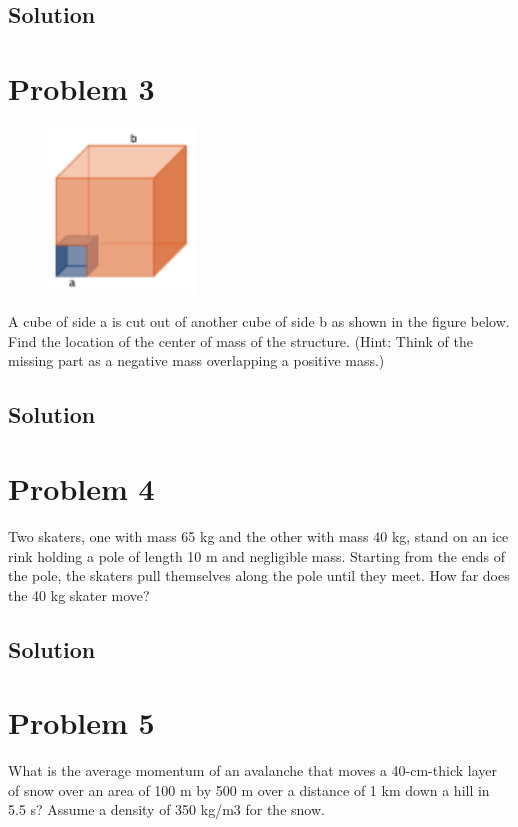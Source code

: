 \documentclass[12pt]{article}
\begin{document}
\subsection*{Solution}


\pagebreak
\section*{Problem 3}
\begin{figure}
    \vspace{-30pt}
    \includegraphics[width=0.35\textwidth]{graph_3.png} 
\end{figure}
A cube of side a is cut out of another cube of side b as shown in the figure below. Find the location of
the center of mass of the structure. (Hint: Think of the missing part as a negative mass overlapping a
positive mass.)

\subsection*{Solution}


\pagebreak
\section*{Problem 4}
Two skaters, one with mass 65 kg and the other with mass 40 kg, stand on an ice rink holding a pole
of length 10 m and negligible mass. Starting from the ends of the pole, the skaters pull themselves along
the pole until they meet. How far does the 40 kg skater move?

\subsection*{Solution}


\pagebreak
\section*{Problem 5}
What is the average momentum of an avalanche that moves a 40-cm-thick layer of snow over an area
of 100 m by 500 m over a distance of 1 km down a hill in 5.5 s? Assume a density of 350 kg/m3 for the
snow.
\end{document}
